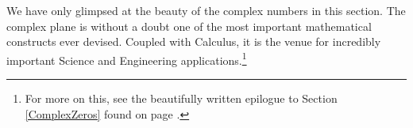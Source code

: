 \documentclass{ximera}
\begin{document}
We have only glimpsed at the beauty of the complex numbers in this section.  The complex plane is without a doubt one of the most important mathematical constructs ever devised.  Coupled with Calculus, it is the venue for incredibly important Science and Engineering applications.\footnote{For more on this, see the beautifully written epilogue to Section \ref{ComplexZeros} found on page \pageref{complexepilogue}.} 




\closegraphsfile
\end{document}
